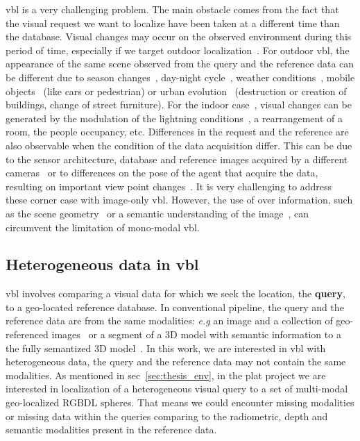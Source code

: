 	\Ac{vbl} is a very challenging problem. The main obstacle comes from the fact that the visual request we want to localize have been taken at a different time than the database. Visual changes may occur on the observed environment during this period of time, especially if we target outdoor localization~\citep{Lowry2016, Sattler2017a}. For outdoor \ac{vbl}, the appearance of the same scene observed from the query and the reference data can be different due to season changes~\citep{Krajnik2017a}, day-night cycle~\citep{Porav2018}, weather conditions~\citep{Porav2019}, mobile objects~\citep{Toft2018} (like cars or pedestrian) or urban evolution~\citep{Saha2018} (\eg destruction or creation of buildings, change of street furniture). For the indoor case~\citep{Taira2018}, visual changes can be generated by the modulation of the lightning conditions~\citep{Lu2016}, a rearrangement of a room, the people occupancy, etc. Differences in the request and the reference are also observable when the condition of the data acquisition differ. This can be due to the sensor architecture, \eg database and reference images acquired by a different cameras~\citep{Middelberg2014, Majdik2013} or to differences on the pose of the agent that acquire the data, resulting on important view point changes~\citep{Majdik2013, Torii2011, Lin2013, Vo2016, Tian2017}. It is very challenging to address these corner case with image-only \ac{vbl}. However, the use of over information, such as the scene geometry~\citep{Uy2018, Yew2018} or a semantic understanding of the image~\citep{Weinzaepfel2019}, can circumvent the limitation of mono-modal \ac{vbl}.
		
\subsection{Heterogeneous data in \acs{vbl}}
	\Ac{vbl} involves comparing a visual data for which we seek the location, the \textbf{query}, to a geo-located reference database. In conventional pipeline, the query and the reference data are from the same modalities: \textit{e.g} an image and a collection of geo-referenced images~\citep{Arandjelovic2014, Arandjelovic2017} or a segment of a 3D model with semantic information to a the fully semantized 3D model~\citep{Schonberger2017a}. In this work, we are interested in \ac{vbl} with heterogeneous data, \ie the query and the reference data may not contain the same modalities. As mentioned in \acl{sec}~\ref{sec:thesis_env}, in the \ac{plat} project we are interested in localization of a heterogeneous visual query to a set of multi-modal geo-localized RGBDL spheres. That means we could encounter missing modalities or missing data within the queries comparing to the radiometric, depth and semantic modalities present in the reference data. 
	
